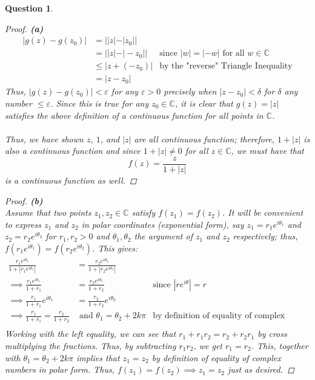 \documentclass[10pt,a4paper]{article}
\newtheorem*{question*}{Question}
\begin{document}
\begin{question*}{$ $}
\begin{proof}{\textbf{(a)}}
\begin{align*}
|g(z) - g(z_0)| &= ||z| - |z_0||\\
&= ||z| - |-z_0|| &\text{since } |w| = |-w| \text{ for all } w \in \mathbb{C}\\
&\leq |z + (-z_0)| &\text{by the "reverse" Triangle Inequality}\\
&= |z - z_0|
\end{align*}
Thus, $|g(z) - g(z_0)| < \varepsilon$ for any $\varepsilon > 0$ precisely when $|z - z_0| < \delta$ for $\delta$ any number $\leq \varepsilon$. Since this is true for any $z_0 \in \mathbb{C}$, it is clear that $g(z) = |z|$ satisfies the above definition of a continuous function for all points in $\mathbb{C}$.\\
\\Thus, we have shown $z$, $1$, and $|z|$ are all continuous function; therefore, $1 + |z|$ is also a continuous function and since $1 + |z| \neq 0$ for all $z \in \mathbb{C}$, we must have that \[f(z) = \frac{z}{1 + |z|}\] is a continuous function as well. 
\end{proof}

\begin{proof}{\textbf{(b)}}
\\Assume that two points $z_1, z_2 \in \mathbb{C}$ satisfy $f(z_1) = f(z_2)$. It will be convenient to express $z_1$ and $z_2$ in polar coordinates (exponential form), say $z_1 = r_1e^{i\theta_1}$ and $z_2 = r_2e^{i\theta_2}$ for $r_1, r_2 > 0$ and $\theta_1, \theta_2$ the argument of $z_1$ and $z_2$ respectively; thus, $f(r_1e^{i\theta_1}) = f(r_2e^{i\theta_2})$. This gives:
\begin{align*}
\frac{r_1e^{i\theta_1}}{1 + |r_1e^{i\theta_1}|} &= \frac{r_2e^{i\theta_2}}{1 + |r_2e^{i\theta_2}|}\\
\implies \frac{r_1e^{i\theta_1}}{1 + r_1} &= \frac{r_2e^{i\theta_2}}{1 + r_2} &\text{since } |re^{i\theta}| = r\\
\implies \frac{r_1}{1 + r_1}e^{i\theta_1} &= \frac{r_2}{1 + r_2}e^{i\theta_2}\\
\implies \frac{r_1}{1 + r_1} = \frac{r_2}{1 + r_2} &\text{ and } \theta_1 = \theta_2 + 2k\pi &\text{by definition of equality of complex numbers in polar form}\\
\end{align*}
Working with the left equality, we can see that $r_1 + r_1r_2 = r_2 + r_2r_1$ by cross multiplying the fractions. Thus, by subtracting $r_1r_2$, we get $r_1 = r_2$. This, together with $\theta_1 = \theta_2 + 2k\pi$ implies that $z_1 = z_2$ by definition of equality of complex numbers in polar form. Thus, $f(z_1) = f(z_2) \implies z_1 = z_2$ just as desired.
\end{proof}


\end{question*}
\end{document}
